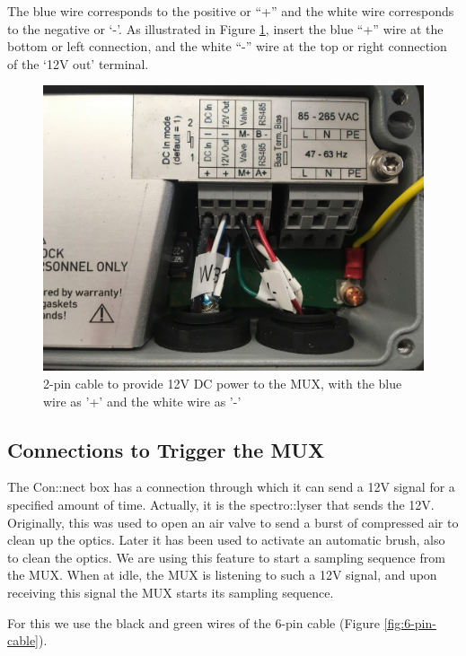 \documentclass[]{book}
\begin{document}
The blue wire corresponds to the positive or ``+'' and the white wire corresponds to the negative or `-'. As illustrated in Figure \ref{fig:ConnectBox1}, insert the blue ``+'' wire at the bottom or left connection, and the white ``-'' wire at the top or right connection of the `12V out' terminal.

\begin{figure}

{\centering \includegraphics[width=0.7\linewidth]{pictures/ConnectBox1} 

}

\caption{2-pin cable to provide 12V DC power to the MUX, with the blue wire as '+' and the white wire as '-'}\label{fig:ConnectBox1}
\end{figure}

\hypertarget{connections-to-trigger-the-mux}{%
\subsection{Connections to Trigger the MUX}\label{connections-to-trigger-the-mux}}

The Con::nect box has a connection through which it can send a 12V signal for a specified amount of time. Actually, it is the spectro::lyser that sends the 12V. Originally, this was used to open an air valve to send a burst of compressed air to clean up the optics. Later it has been used to activate an automatic brush, also to clean the optics. We are using this feature to start a sampling sequence from the MUX. When at idle, the MUX is listening to such a 12V signal, and upon receiving this signal the MUX starts its sampling sequence.

For this we use the black and green wires of the 6-pin cable (Figure \ref{fig:6-pin-cable}).
\end{document}
